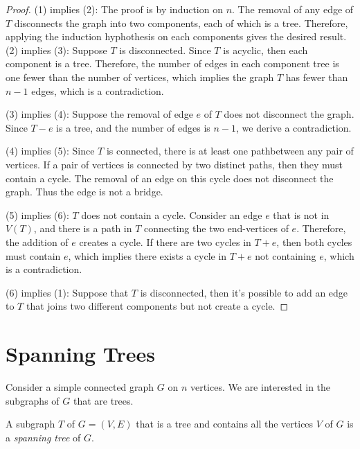 \begin{proof}
(1) implies (2):
The proof is by induction on $n$.
The removal of any edge of $T$ disconnects the graph into two components, each of which is a tree.
Therefore, applying the induction hyphothesis on each components gives the desired result.
(2) implies (3):
Suppose $T$ is disconnected. Since $T$ is acyclic, then each component is a tree.
Therefore, the number of edges in each component tree is one fewer than the number of vertices, which implies the  graph $T$ has fewer than $n-1$ edges, which is a contradiction.

(3) implies (4):
Suppose the removal of edge $e$ of $T$ does not disconnect the graph.
Since $T-e$ is a tree, and the number of edges is $n-1$, we derive a contradiction.

(4) implies (5):
Since $T$ is connected, there is at least one pathbetween any pair of vertices.
If a pair of vertices is connected by two distinct paths, then they must contain a cycle.
The removal of an edge on this cycle does not disconnect the graph. Thus the edge is not a bridge.

(5) implies (6):
$T$ does not contain a cycle.
Consider an edge $e$ that is not in $V(T)$, and there is a path in $T$ connecting the two end-vertices of $e$. Therefore, the addition of $e$ creates a cycle.
If there are two cycles in $T+e$, then both cycles must contain $e$, which implies there exists a cycle in $T+e$ not containing $e$, which is a contradiction.

(6) implies (1):
Suppose that $T$ is disconnected, then it's possible to add an edge to $T$ that joins two different components but not create a cycle.
\end{proof}

\section{Spanning Trees}
Consider a simple connected graph $G$ on $n$ vertices. We are interested in the subgraphs of $G$ that are trees.
\begin{definition}
A subgraph $T$ of $G=(V,E)$ that is a tree and contains all the vertices $V$ of $G$ is a \emph{spanning tree} of $G$.
\end{definition}


